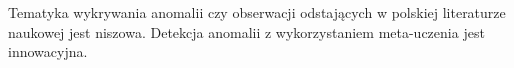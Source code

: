 Tematyka wykrywania anomalii czy obserwacji odstających w polskiej literaturze naukowej jest niszowa. Detekcja anomalii z wykorzystaniem meta-uczenia jest innowacyjna.